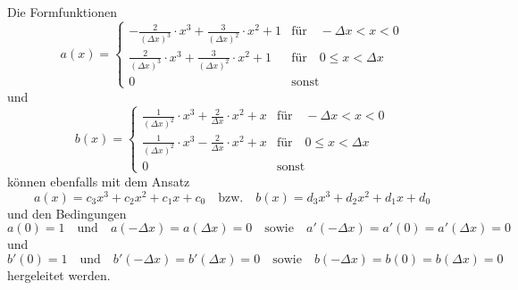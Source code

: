 Die Formfunktionen
\begin{equation}
    a(x) = \left\{ \begin{array}{ll}
        - \frac{2}{(\Delta x)^3} \cdot x^3 + \frac{3}{(\Delta x)^2} \cdot x^2 + 1 
            & \text{für} \quad -\Delta x < x < 0 \\
        \frac{2}{(\Delta x)^3} \cdot x^3 + \frac{3}{(\Delta x)^2} \cdot x^2 + 1 
            & \text{für} \quad 0 \leq x < \Delta x \\
        0
            & \text{sonst}
    \end{array} \right.
\end{equation}
und
\begin{equation}
    b(x) = \left\{ \begin{array}{ll}
        \frac{1}{(\Delta x)^2} \cdot x^3 + \frac{2}{\Delta x} \cdot x^2 + x 
            & \text{für} \quad -\Delta x < x < 0 \\
        \frac{1}{(\Delta x)^2} \cdot x^3 - \frac{2}{\Delta x} \cdot x^2 + x 
            & \text{für} \quad 0 \leq x < \Delta x \\
        0
            & \text{sonst}
    \end{array} \right.
\end{equation}
können ebenfalls mit dem Ansatz
\begin{equation}
    a(x) = c_3x^3 + c_2x^2 + c_1x + c_0 \quad 
    \text{bzw.} \quad
    b(x) = d_3x^3 + d_2x^2 + d_1x + d_0
\end{equation}
und den Bedingungen 
\begin{equation}
        a(0) = 1 \quad
        \text{und} \quad
        a(-\Delta x) = a(\Delta x) = 0 \quad
        \text{sowie} \quad
        a'(-\Delta x) = a'(0) = a'(\Delta x) = 0
\end{equation}
und
\begin{equation}
        b'(0) = 1 \quad
        \text{und} \quad
        b'(-\Delta x) = b'(\Delta x) = 0 \quad
        \text{sowie} \quad
        b(-\Delta x) = b(0) = b(\Delta x) = 0
\end{equation}
hergeleitet werden.


